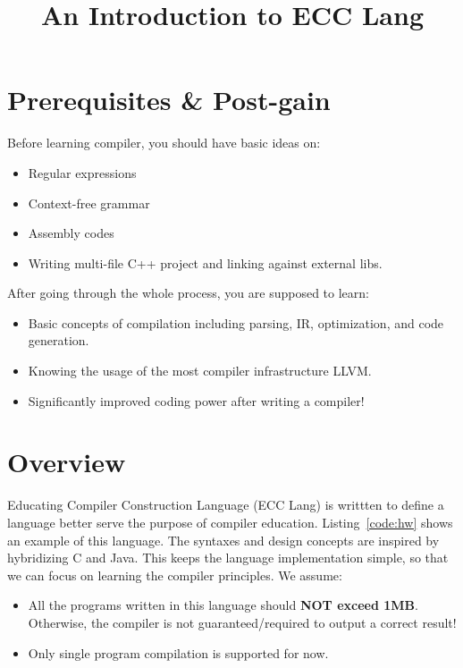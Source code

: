 \documentclass{article}
\title{An Introduction to ECC Lang}
\date{}
\begin{document}
\maketitle

\section{Prerequisites \& Post-gain}

Before learning compiler, you should have basic ideas on:
\begin{itemize}
  \item Regular expressions
  \item Context-free grammar
  \item Assembly codes
  \item Writing multi-file C++ project and linking against external libs.
\end{itemize}

\noindent After going through the whole process, you are supposed to learn:
\begin{itemize}
  \item Basic concepts of compilation including parsing, IR, optimization, and code generation.
  \item Knowing the usage of the most compiler infrastructure LLVM.
  \item Significantly improved coding power after writing a compiler!
\end{itemize}

\section{Overview}

Educating Compiler Construction Language (ECC Lang) is writtten to define
a language better serve the purpose of compiler education.
Listing~\ref{code:hw} shows an example of this language.
The syntaxes and design concepts are inspired by hybridizing C and Java.
This keeps the language implementation simple, so that we can focus on
learning the compiler principles.
We assume:
\begin{itemize}
  \item All the programs written in this language should \textbf{NOT exceed 1MB}.
    Otherwise, the compiler is not guaranteed/required to output a correct result!
  \item Only single program compilation is supported for now.
\end{itemize}
\end{document}

